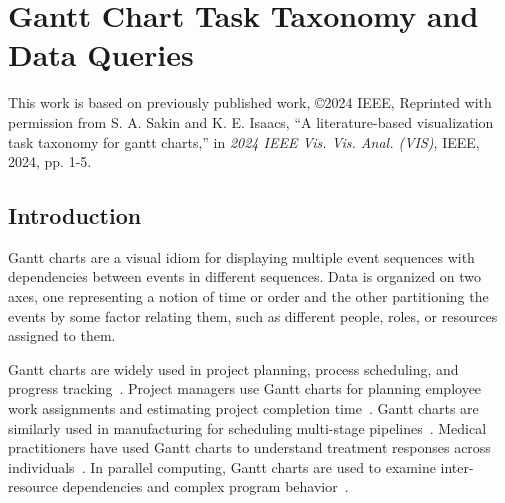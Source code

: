 \chapter{Gantt Chart Task Taxonomy and Data Queries}
\label{chap:gantt-taxonomy}

\begin{refsection}
This work is based on previously published work, \copyright  2024 IEEE, Reprinted with permission from S. A. Sakin and K. E. Isaacs, ``A literature-based visualization task taxonomy for gantt charts,'' in \emph{2024 IEEE Vis. Vis. Anal. (VIS)}, IEEE, 2024, pp. 1-5.

\section{Introduction}
\label{sec:ch4-first-intro}

Gantt charts are a visual idiom for displaying multiple event sequences with dependencies between events in different sequences. Data is organized on two axes, one representing a notion of time or order and the other partitioning the events by some factor relating them, such as different people, roles, or resources assigned to them.

Gantt charts are widely used in project planning, process scheduling, and progress tracking~\cite{wilson2003gantt}. Project managers use Gantt charts for planning employee work assignments and estimating project completion time~\cite{tory2013comparative}. Gantt charts are similarly used in manufacturing for scheduling multi-stage pipelines~\cite{jo2014livegantt}. Medical practitioners have used Gantt charts to understand treatment responses across individuals~\cite{antweiler2022uncovering}. In parallel computing, Gantt charts are used to examine inter-resource dependencies and complex program behavior~\cite{isaacs2014state}.


\end{refsection}
